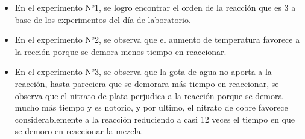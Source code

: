 \documentclass[../main.tex]{subfiles}
\begin{document}
\begin{itemize}
    \item En el experimento N°1, se logro encontrar el orden de la reacción que es 3 a base de los experimentos del día de laboratorio.
    \item En el experimento N°2, se observa que el aumento de temperatura favorece a la rección porque se demora menos tiempo en reaccionar.
    \item En el experimento N°3, se observa que la gota de agua no aporta a la reacción, hasta pareciera que se demorara más tiempo en reaccionar, se observa que el nitrato de plata perjudica a la reacción porque se demora mucho más tiempo y es notorio, y por ultimo, el nitrato de cobre favorece considerablemente a la reacción reduciendo a casi 12 veces el tiempo en que se demoro en reaccionar la mezcla.
\end{itemize}
\end{document}
